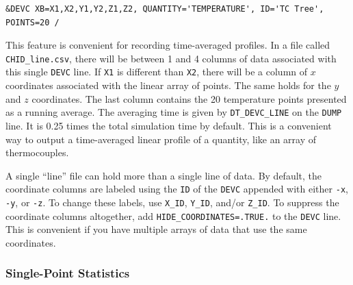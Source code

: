 \documentclass[11pt]{book}
\newcommand{\ct}{\tt\small}
\begin{document}
\footnotesize
\begin{verbatim}
&DEVC XB=X1,X2,Y1,Y2,Z1,Z2, QUANTITY='TEMPERATURE', ID='TC Tree', POINTS=20 /
\end{verbatim}
\normalsize

\noindent This feature is convenient for recording time-averaged profiles.
In a file called {\ct CHID\_line.csv}, there will be between 1 and 4 columns of data associated with this single {\ct DEVC} line. If {\ct X1} is
different than {\ct X2}, there will be a column of $x$ coordinates associated with the linear array of points. The same holds for the $y$ and
$z$ coordinates. The last column contains the 20 temperature points presented as a running average. The
averaging time is given by {\ct DT\_DEVC\_LINE} on the {\ct DUMP} line. It is 0.25 times the total simulation time by default. This is a convenient
way to output a time-averaged linear profile of a quantity, like an array of thermocouples.

A single ``line'' file can hold more than a single line of data. By default, the coordinate columns are labeled using the {\ct ID} of the {\ct DEVC} appended with
either {\ct -x}, {\ct -y}, or {\ct -z}. To change these labels, use {\ct X\_ID}, {\ct Y\_ID}, and/or {\ct Z\_ID}. To suppress the coordinate columns altogether, add
{\ct HIDE\_COORDINATES=.TRUE.} to the {\ct DEVC} line. This is convenient if you have multiple arrays of data that use the same coordinates.

\subsubsection{Single-Point Statistics}
\end{document}
